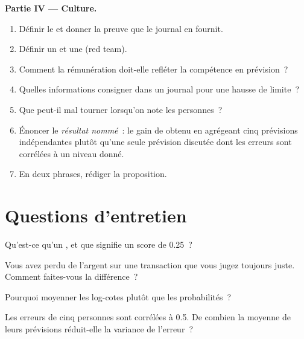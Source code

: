 \begin{problem}
\medskip\noindent\textbf{Partie IV --- Culture.}
\begin{enumerate}[resume]
\item Définir le  et donner la preuve que le journal en fournit.
\item Définir un  et une  (red team).
\item Comment la rémunération doit-elle refléter la compétence en prévision~?
\item Quelles informations consigner dans un journal pour une hausse de limite~?
\item Que peut-il mal tourner lorsqu'on note les personnes~?
\item Énoncer le \emph{résultat nommé}~: le gain de  obtenu en agrégeant cinq prévisions indépendantes plutôt qu'une seule prévision discutée dont
les erreurs sont corrélées à un niveau donné.
\item En deux phrases, rédiger la proposition.
\end{enumerate}
\end{problem}

\section{Questions d'entretien}

\begin{interviewq}\label{iq:fm:culture-and-decision-making:1}
Qu'est-ce qu'un , et que signifie un score de 0.25~?
\end{interviewq}

\begin{interviewq}\label{iq:fm:culture-and-decision-making:2}
Vous avez perdu de l'argent sur une transaction que vous jugez toujours juste. Comment faites-vous la différence~?
\end{interviewq}

\begin{interviewq}\label{iq:fm:culture-and-decision-making:3}
Pourquoi moyenner les log-cotes plutôt que les probabilités~?
\end{interviewq}

\begin{interviewq}\label{iq:fm:culture-and-decision-making:4}
Les erreurs de cinq personnes sont corrélées à 0.5. De combien la moyenne de leurs prévisions réduit-elle la variance de l'erreur~?
\end{interviewq}

